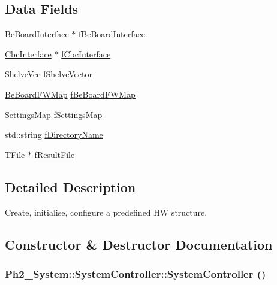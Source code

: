 \subsection*{Data Fields}
\begin{CompactItemize}
\item 
\hyperlink{class_ph2___hw_interface_1_1_be_board_interface}{Be\-Board\-Interface} $\ast$ \hyperlink{class_ph2___system_1_1_system_controller_8e8bc5e14aaf6659673c16c7dea5e57d}{f\-Be\-Board\-Interface}
\item 
\hyperlink{class_ph2___hw_interface_1_1_cbc_interface}{Cbc\-Interface} $\ast$ \hyperlink{class_ph2___system_1_1_system_controller_e38e8bcea2b76c5981d2b0e49559ad16}{f\-Cbc\-Interface}
\item 
\hyperlink{namespace_ph2___system_1c21eed494ab8a888694adf3de379dcf}{Shelve\-Vec} \hyperlink{class_ph2___system_1_1_system_controller_f40cecc7ed4b9854db0fcb64e287689f}{f\-Shelve\-Vector}
\item 
\hyperlink{namespace_ph2___hw_interface_59fe3165f25ded62b5b12cf0ebc69e8d}{Be\-Board\-FWMap} \hyperlink{class_ph2___system_1_1_system_controller_84042bff8bf08490a04e82bdeea9c7d6}{f\-Be\-Board\-FWMap}
\item 
\hyperlink{namespace_ph2___system_f2bca61b7444e1e35ab6bccba079876b}{Settings\-Map} \hyperlink{class_ph2___system_1_1_system_controller_18fd8d1b9c57b411097430646e1dda9a}{f\-Settings\-Map}
\item 
std::string \hyperlink{class_ph2___system_1_1_system_controller_9b8f6dbf9a063b51334c3ff91b10adac}{f\-Directory\-Name}
\item 
TFile $\ast$ \hyperlink{class_ph2___system_1_1_system_controller_46b3561e7e3689dd67b58ac9962e1518}{f\-Result\-File}
\end{CompactItemize}


\subsection{Detailed Description}
Create, initialise, configure a predefined HW structure. 



\subsection{Constructor \& Destructor Documentation}
\hypertarget{class_ph2___system_1_1_system_controller_7755f0304eb845c975862df469f25e70}{
\subsubsection[SystemController]{\setlength{\rightskip}{0pt plus 5cm}Ph2\_\-System::System\-Controller::System\-Controller ()}}
\label{class_ph2___system_1_1_system_controller_7755f0304eb845c975862df469f25e70}


